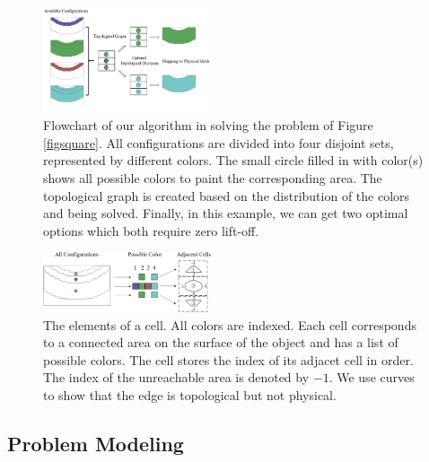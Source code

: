 \documentclass[journal]{IEEEtran}
\begin{document}
\begin{figure}[t]
\centering
\includegraphics[width = 0.44\textwidth]{flowchart}
\caption{
Flowchart of our algorithm in solving the problem of Figure \ref{figsquare}. 
All configurations are divided into four disjoint sets, represented by different colors. 
The small circle filled in with color(s) shows all possible colors to paint the corresponding area. The topological graph is created based on the distribution of the colors and being solved. Finally, in this example, we can get two optimal options which both require zero lift-off. 
}\label{flowchart}
\end{figure}


\begin{figure}[t]
\centering
\includegraphics[width = 0.44\textwidth]{square_example/graphcreation}
\caption{The elements of a cell. All colors are indexed. Each cell corresponds to a connected area on the surface of the object and has a list of possible colors. The cell stores the index of its adjacet cell in order. The index of the unreachable area is denoted by $-1$. We use curves to show that the edge is topological but not physical. }\label{figforcolor}
\end{figure}



\subsection{Problem Modeling}\label{sectionmodelling}
\end{document}
